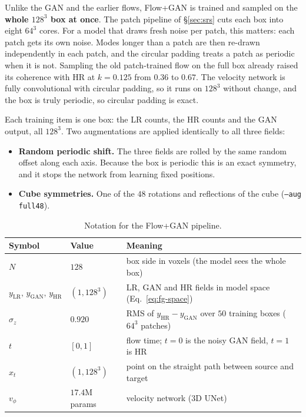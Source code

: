 Unlike the GAN and the earlier flows, Flow+GAN is trained and sampled on the
\textbf{whole $128^3$ box at once}. The patch pipeline of \S\ref{sec:srs} cuts
each box into eight $64^3$ cores. For a model that draws fresh noise per patch,
this matters: each patch gets its own noise. Modes longer than a patch are then
re-drawn independently in each patch, and the circular padding treats a patch as
periodic when it is not. Sampling the old patch-trained flow on the full box
already raised its coherence with HR at $k=0.125$ from $0.36$ to $0.67$. The
velocity network is fully convolutional with circular padding, so it runs on
$128^3$ without change, and the box is truly periodic, so circular padding is
exact.

Each training item is one box: the LR counts, the HR counts and the GAN output,
all $128^3$. Two augmentations are applied identically to all three fields:
\begin{itemize}
  \item \textbf{Random periodic shift.} The three fields are rolled by the same
  random offset along each axis. Because the box is periodic this is an exact
  symmetry, and it stops the network from learning fixed positions.
  \item \textbf{Cube symmetries.} One of the $48$ rotations and reflections of
  the cube (\texttt{--aug full48}).
\end{itemize}

\begin{table}[t]
\centering
\caption{Notation for the Flow+GAN pipeline.}
\label{tab:fg-notation}
\begin{tabular}{llp{7.0cm}}
\toprule
Symbol & Value & Meaning \\
\midrule
$N$ & $128$ & box side in voxels (the model sees the whole box) \\
$y_\text{LR},\,y_\text{GAN},\,y_\text{HR}$ & $(1,128^3)$ & LR, GAN and HR fields in model space (Eq.~\ref{eq:fg-space}) \\
$\sigma_z$ & $0.920$ & RMS of $y_\text{HR}-y_\text{GAN}$ over $50$ training boxes ($64^3$ patches) \\
$t$ & $[0,1]$ & flow time; $t{=}0$ is the noisy GAN field, $t{=}1$ is HR \\
$x_t$ & $(1,128^3)$ & point on the straight path between source and target \\
$v_\phi$ & $17.4$M params & velocity network (3D UNet) \\
\bottomrule
\end{tabular}
\end{table}

